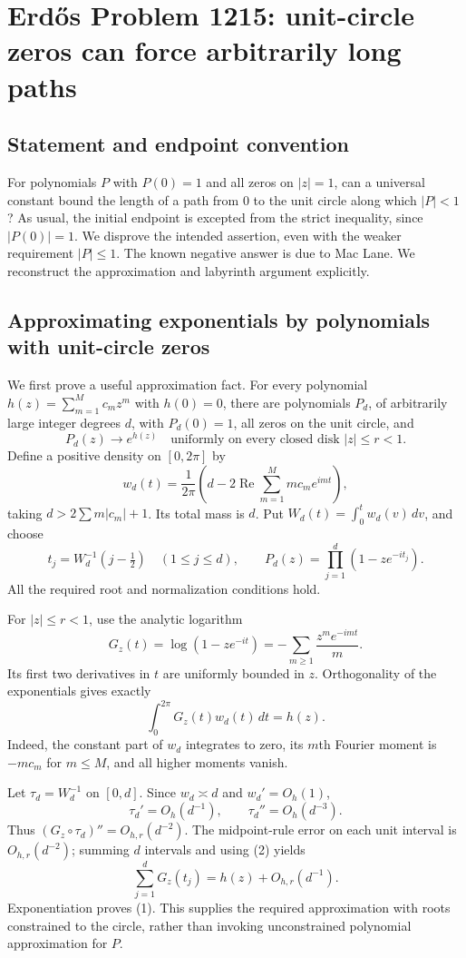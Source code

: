 \section*{Erd\H{o}s Problem 1215: unit-circle zeros can force arbitrarily long paths}
\subsection*{Statement and endpoint convention}
For polynomials $P$ with $P(0)=1$ and all zeros on $|z|=1$, can a universal constant bound the length of a path from $0$ to the unit circle along which $|P|<1$? As usual, the initial endpoint is excepted from the strict inequality, since $|P(0)|=1$. We disprove the intended assertion, even with the weaker requirement $|P|\le1$. The known negative answer is due to Mac Lane. We reconstruct the approximation and labyrinth argument explicitly.

\subsection*{Approximating exponentials by polynomials with unit-circle zeros}
We first prove a useful approximation fact. For every polynomial
$h(z)=\sum_{m=1}^M c_mz^m$ with $h(0)=0$, there are polynomials $P_d$, of arbitrarily large integer degrees $d$, with $P_d(0)=1$, all zeros on the unit circle, and
\[
 P_d(z)\longrightarrow e^{h(z)}
 \quad\text{uniformly on every closed disk }|z|\le r<1.
 \tag{1}
\]
Define a positive density on $[0,2\pi]$ by
\[
 w_d(t)=\frac1{2\pi}\left(d-2\operatorname{Re}
                       \sum_{m=1}^M mc_me^{imt}\right),
\]
taking $d>2\sum m|c_m|+1$. Its total mass is $d$. Put
$W_d(t)=\int_0^t w_d(v)\,dv$, and choose
\[
 t_j=W_d^{-1}(j-\tfrac12)\quad(1\le j\le d),\qquad
 P_d(z)=\prod_{j=1}^d(1-ze^{-it_j}).
\]
All the required root and normalization conditions hold.

For $|z|\le r<1$, use the analytic logarithm
\[
 G_z(t)=\log(1-ze^{-it})=-\sum_{m\ge1}\frac{z^me^{-imt}}m.
\]
Its first two derivatives in $t$ are uniformly bounded in $z$. Orthogonality of the exponentials gives exactly
\[
 \int_0^{2\pi}G_z(t)w_d(t)\,dt=h(z).
 \tag{2}
\]
Indeed, the constant part of $w_d$ integrates to zero, its $m$th Fourier moment is $-mc_m$ for $m\le M$, and all higher moments vanish.

Let $\tau_d=W_d^{-1}$ on $[0,d]$. Since $w_d\asymp d$ and $w_d'=O_h(1)$,
\[
 \tau_d'=O_h(d^{-1}),\qquad \tau_d''=O_h(d^{-3}).
\]
Thus $(G_z\circ\tau_d)''=O_{h,r}(d^{-2})$. The midpoint-rule error on each unit interval is $O_{h,r}(d^{-2})$; summing $d$ intervals and using (2) yields
\[
 \sum_{j=1}^dG_z(t_j)=h(z)+O_{h,r}(d^{-1}).
\]
Exponentiation proves (1). This supplies the required approximation with roots constrained to the circle, rather than invoking unconstrained polynomial approximation for $P$.

